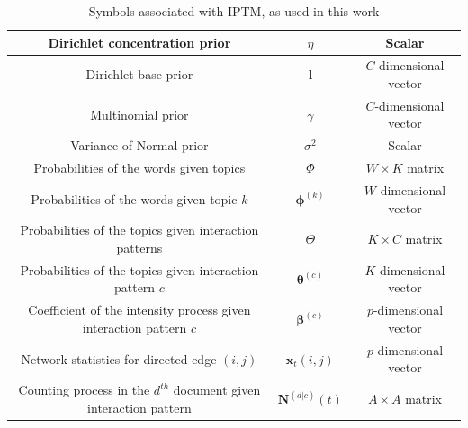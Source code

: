 \documentclass[a4paper]{article}
\begin{document}
\begin{table}[ht]
{\begin{tabular}{ |c|c|c|}
  								\hline				 	
  									Dirichlet concentration  prior&$\eta$ & Scalar \\
  									\hline		
  										Dirichlet base prior&$\boldsymbol{l}$ & $C$-dimensional vector  \\
  										\hline			
  				Multinomial prior&$\gamma$ & $C$-dimensional vector \\
  				\hline
  				Variance of Normal prior&$\sigma^2$ & Scalar \\
  				\hline		
  					Probabilities of the words given topics &$\Phi$ & $W \times K$ matrix \\
  					\hline		
  						Probabilities of the words given topic $k$ &$\boldsymbol{\phi}^{(k)}$ & $W$-dimensional vector\\
  						\hline
  							Probabilities of the topics given interaction patterns &$\Theta$ & $K \times C$ matrix \\
  							\hline		
  							Probabilities of the topics given interaction pattern $c$ &$\boldsymbol{\theta}^{(c)}$ & $K$-dimensional vector\\
  						\hline		
  						Coefficient of the intensity process given interaction pattern $c$ &$\boldsymbol{\beta}^{(c)}$ & $p$-dimensional vector\\
  							\hline		
  					Network statistics for directed edge $(i, j)$ &$\boldsymbol{x}_t{(i,j)}$ & $p$-dimensional vector\\
  						\hline		
  				Counting process in the $d^{th}$ document given interaction pattern &	$\mathbf{N}^{(d|c)}(t)$ & $A\times A$ matrix\\
  						\hline
  						\hline
 	\end{tabular}}
 	\caption {Symbols associated with IPTM, as used in this work}
 	\label{table:SymbolsIPTM}
 \end{table}
\normalsize
\end{document}

